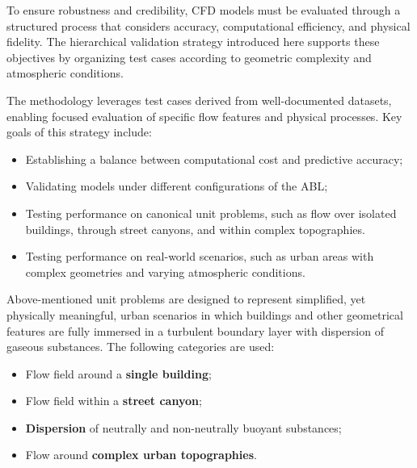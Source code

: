 To ensure robustness and credibility, CFD models must be evaluated through a structured process that considers accuracy, computational efficiency, and physical fidelity. The hierarchical validation strategy introduced here supports these objectives by organizing test cases according to geometric complexity and atmospheric conditions.

The methodology leverages test cases derived from well-documented datasets, enabling focused evaluation of specific flow features and physical processes. Key goals of this strategy include:

\begin{itemize}
    \item Establishing a balance between computational cost and predictive accuracy;
    \item Validating models under different configurations of the ABL;
    \item Testing performance on canonical unit problems, such as flow over isolated buildings, through street canyons, and within complex topographies.
    \item Testing performance on real-world scenarios, such as urban areas with complex geometries and varying atmospheric conditions.
\end{itemize}

\noindent
Above-mentioned unit problems are designed to represent simplified, yet physically meaningful, urban scenarios in which buildings and other geometrical features are fully immersed in a turbulent boundary layer with dispersion of gaseous substances. The following categories are used:

\begin{itemize}
    \item Flow field around a \textbf{single building};
    \item Flow field within a \textbf{street canyon};
    \item \textbf{Dispersion} of neutrally and non-neutrally buoyant substances;
    \item Flow around \textbf{complex urban topographies}.
\end{itemize}

